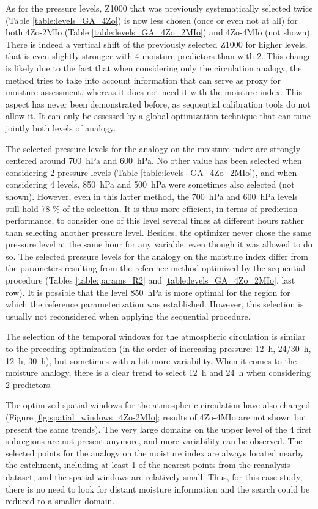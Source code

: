 \documentclass[review]{elsarticle}
\begin{document}
As for the pressure levels, Z1000 that was previously systematically selected twice (Table \ref{table:levels_GA_4Zo}) is now less chosen (once or even not at all) for both 4Zo-2MIo (Table \ref{table:levels_GA_4Zo_2MIo}) and 4Zo-4MIo (not shown). There is indeed a vertical shift of the previously selected Z1000 for higher levels, that is even slightly stronger with 4 moisture predictors than with 2. This change is likely due to the fact that when considering only the circulation analogy, the method tries to take into account information that can serve as proxy for moisture assessment, whereas it does not need it with the moisture index. This aspect has never been demonstrated before, as sequential calibration tools do not allow it. It can only be assessed by a global optimization technique that can tune jointly both levels of analogy. 

The selected pressure levels for the analogy on the moisture index are strongly centered around 700~hPa and 600~hPa. No other value has been selected when considering 2 pressure levels (Table \ref{table:levels_GA_4Zo_2MIo}), and when considering 4 levels, 850~hPa and 500~hPa were sometimes also selected (not shown). However, even in this latter method, the 700~hPa and 600~hPa levels still hold 78 \% of the selection. It is thus more efficient, in terms of prediction performance, to consider one of this level several times at different hours rather than selecting another pressure level. Besides, the optimizer never chose the same pressure level at the same hour for any variable, even though it was allowed to do so. The selected pressure levels for the analogy on the moisture index differ from the parameters resulting from the reference method optimized by the sequential procedure (Tables \ref{table:params_R2} and \ref{table:levels_GA_4Zo_2MIo}, last row). It is possible that the level 850~hPa is more optimal for the region for which the reference parameterization was established. However, this selection is usually not reconsidered when applying the sequential procedure.

The selection of the temporal windows for the atmospheric circulation is similar to the preceding optimization (in the order of increasing pressure: 12~h, 24/30~h, 12~h, 30~h), but sometimes with a bit more variability. When it comes to the moisture analogy, there is a clear trend to select 12~h and 24~h when considering 2 predictors.

The optimized spatial windows for the atmospheric circulation have also changed (Figure \ref{fig:spatial_windows_4Zo-2MIo}; results of 4Zo-4MIo are not shown but present the same trends). The very large domains on the upper level of the 4 first subregions are not present anymore, and more variability can be observed. The selected points for the analogy on the moisture index are always located nearby the catchment, including at least 1 of the nearest points from the reanalysis dataset, and the spatial windows are relatively small. Thus, for this case study, there is no need to look for distant moisture information and the search could be reduced to a smaller domain. 
\end{document}
